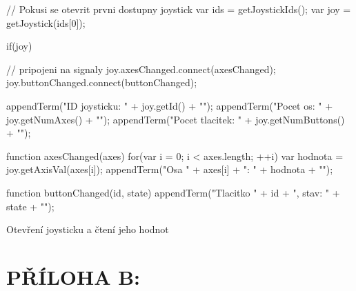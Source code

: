 \documentclass[12pt, a4paper, oneside]{article}
\begin{document}
\begin{listing}[H]
\begin{jscode}
// Pokusi se otevrit prvni dostupny joystick
var ids = getJoystickIds();
var joy = getJoystick(ids[0]);

if(joy) {
    // pripojeni na signaly
    joy.axesChanged.connect(axesChanged);
    joy.buttonChanged.connect(buttonChanged);

    appendTerm("ID joysticku: " + joy.getId() + "\n");
    appendTerm("Pocet os: " + joy.getNumAxes() + "\n");
    appendTerm("Pocet tlacitek: " +
            joy.getNumButtons() + "\n");
}

function axesChanged(axes) {
    for(var i = 0; i < axes.length; ++i) {
        var hodnota = joy.getAxisVal(axes[i]);
        appendTerm("Osa " + axes[i] + ": " + hodnota + "\n");
    }
}

function buttonChanged(id, state) {
    appendTerm("Tlacitko " + id + ", stav: " + state + "\n");
}
\end{jscode}
\caption{Otevření joysticku a čtení jeho hodnot}
\end{listing}

\newpage
\section*{PŘÍLOHA B:}
\end{document}

